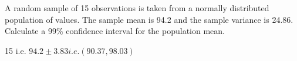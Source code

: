 \documentclass[a4paper,12pt]{article}
\begin{document}
A random sample of 15 observations is taken from a normally distributed population
of values. The sample mean is 94.2 and the sample variance is 24.86.
Calculate a 99\% confidence interval for the population mean.


15
i.e. $94.2  i.e. (90.37,98.03)$
\end{document}
